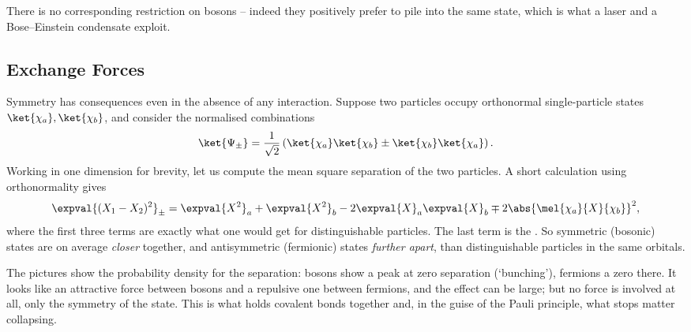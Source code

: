 There is no corresponding restriction on bosons -- indeed they positively prefer to pile into the same state, which is what a laser and a Bose--Einstein condensate exploit.

\subsection{Exchange Forces}

Symmetry has consequences even in the absence of any interaction. Suppose two particles occupy orthonormal single-particle states $\ket{\chi_a}, \ket{\chi_b}$, and consider the normalised combinations
$$
\ket{\Psi_\pm} = \frac{1}{\sqrt2}\left( \ket{\chi_a}\ket{\chi_b} \pm \ket{\chi_b}\ket{\chi_a} \right).
$$
Working in one dimension for brevity, let us compute the mean square separation of the two particles. A short calculation using orthonormality gives
$$
\expval{(X_1 - X_2)^2}_\pm = \expval{X^2}_a + \expval{X^2}_b - 2\expval{X}_a\expval{X}_b \mp 2\abs{\mel{\chi_a}{X}{\chi_b}}^2,
$$
where the first three terms are exactly what one would get for distinguishable particles. The last term is the . So symmetric (bosonic) states are on average \emph{closer} together, and antisymmetric (fermionic) states \emph{further apart}, than distinguishable particles in the same orbitals.

\begin{center}
\end{center}

The pictures show the probability density for the separation: bosons show a peak at zero separation (`bunching'), fermions a zero there. It looks like an attractive force between bosons and a repulsive one between fermions, and the effect can be large; but no force is involved at all, only the symmetry of the state. This  is what holds covalent bonds together and, in the guise of the Pauli principle, what stops matter collapsing.

